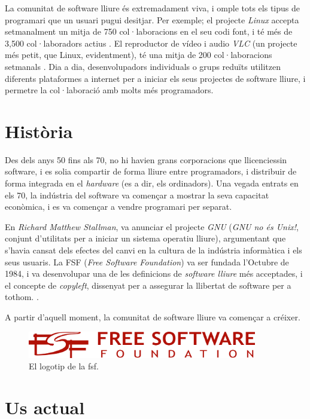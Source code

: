 La comunitat de software lliure és extremadament viva, i omple tots els tipus de programari que un usuari pugui desitjar. Per exemple; el projecte \emph{Linux} accepta setmanalment un mitja de 750 col·laboracions en el seu codi font, i té més de 3,500 col·laboradors actius \cite{linuxgitrepo}. El reproductor de vídeo i audio \emph{VLC} (un projecte més petit, que Linux, evidentment), té una mitja de 200 col·laboracions setmanals \cite{vlcgitrepo}. Dia a dia, desenvolupadors individuals o grups reduïts utilitzen diferents plataformes a internet per a iniciar els seus projectes de software lliure, i permetre la col·laboració amb molts més programadors.

\section{Història}

Des dels anys 50 fins als 70, no hi havien grans corporacions que 
llicenciessin software, i es solia compartir de forma lliure entre
programadors, i distribuir de forma integrada en el \emph{hardware}
(es a dir, els ordinadors). Una vegada entrats en els 70, la indústria del
software va començar a mostrar la seva capacitat econòmica, i es va
començar a vendre programari per separat. \cite{ibmusdata}

En \emph{Richard Matthew Stallman}, va anunciar el projecte \emph{GNU} (\emph{GNU no és Unix!}, conjunt d'utilitats per a iniciar un sistema operatiu lliure), argumentant que s'havia cansat dels efectes del canvi en la cultura de la indústria informàtica i els seus usuaris. La FSF (\emph{Free Software Foundation}) va ser fundada l'Octubre de 1984, i va desenvolupar una de les definicions de \emph{software lliure} més acceptades, i el concepte de \emph{copyleft}, dissenyat per a assegurar la llibertat de software per a tothom. \cite{fossieee}.

A partir d'aquell moment, la comunitat de software lliure va començar a créixer.

\begin{figure}[ht!]
\centering
\includegraphics[width=100mm]{data/fsf.png}
\caption{El logotip de la \ac{fsf}.}
\label{fsfpic}
\end{figure}

\section{Us actual}


